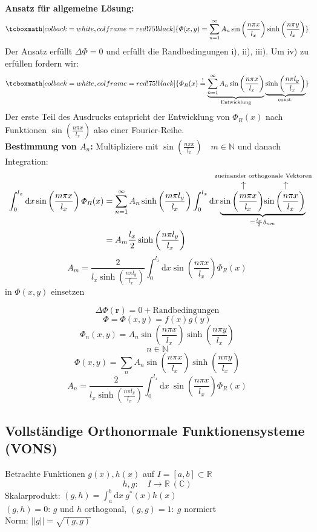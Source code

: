 \documentclass[titlepage,11pt,a4paper,ngerman]{report}
\newcommand{\tx}[1]{\textrm{#1}}
\newcommand{\const}{\tx{const.}}
\newcommand{\ub}[1]{\underbrace{#1}}
\newcommand{\dd}{\tx{d}}
\newcommand{\custoup}[3]{\overset{\scriptstyle\underset{\mkern4mu\rotatebox{-90}{$\hspace{-3pt} #1$}}{#3}}{#2}}
\renewcommand{\Phi}{\varPhi}
\newcommand{\intt}[2]{\int_{#1}^{#2}}
\renewcommand{\vec}[1]{\boldsymbol{#1}}
\newcommand{\rmbox}[1]{\tcboxmath[colback=white,colframe=red!75!black]{#1}}
\newcommand{\bbb}[2]{\begin{tcolorbox}[colback=white,colframe=black,fonttitle=\bfseries,title=#1,sharp corners,tcbox raise base]#2\end{tcolorbox}}
\begin{document}
\textbf{Ansatz für allgemeine Lösung:}
\begin{equation*}
\rmbox{\Phi(x,y) = \sum_{n=1}^{\infty} A_n \sin \left(\frac{n \pi x}{l_x}\right) \sinh \left(\frac{n \pi y}{l_x}\right)}
\end{equation*}
Der Ansatz erfüllt $ \Delta \Phi = 0 $ und erfüllt die Randbedingungen i), ii), iii). Um iv) zu erfüllen fordern wir:
\begin{equation*}
\rmbox{\Phi_R(x) \buildrel ! \over = \ub{\sum_{n=1}^{\infty} A_n \sin\left(\frac{n \pi x}{l_x}\right)}_{\tx{Entwicklung}} \ub{\sinh\left(\frac{n \pi l_y}{l_x}\right)}_{\const}}
\end{equation*}
Der erste Teil des Ausdrucks entspricht der Entwicklung von $ \Phi_R(x) $ nach Funktionen $ \sin \left(\frac{n \pi x}{l_x}\right) $ also einer Fourier-Reihe.\\[5pt]
\textbf{Bestimmung von $ A_n $:}
Multipliziere mit $ \sin\left(\frac{n \pi x}{l_x}\right) \quad m \in \mathbb{N} $ und danach Integration:
\begin{align*}
\int_{0}^{l_x} \dd x \sin\left(\frac{m \pi x}{l_x}\right) \Phi_R (x) &= \sum_{n=1}^{\infty} A_n \sinh\left(\frac{m \pi l_y}{l_x}\right) \int_{0}^{l_x} \dd x \ub{\custoup{\leftarrow}{\sin\left(\frac{m \pi x}{l_x}\right)}{\qquad \qquad \quad \mathclap{\tx{zueinander orthogonale Vektoren}}} \custoup{\leftarrow}{\sin\left(\frac{n \pi x}{l_x}\right)}{}}_{= \frac{l_x}{2} \delta_{nm}}\\
&= A_m \frac{l_x}{2} \sinh\left(\frac{n \pi l_y}{l_x}\right)
\end{align*}
\begin{equation*}
A_m = \frac{2}{l_x \sinh\left(\frac{n \pi l_y}{l_x}\right)} \int_{0}^{l_x} \dd x \sin \left(\frac{n \pi x}{l_x}\right) \Phi_R(x)
\end{equation*}
in $ \Phi(x,y) $ einsetzen\\[5pt]


\bbb{Wiederholung}{$$\Delta \Phi(\vec{r}) = 0 + \textrm{Randbedingungen}$$
$$\Phi = \Phi(x,y) = f(x)g(y)$$
$$\Phi_n(x,y) = A_n \sin\left(\frac{n \pi x}{l_x}\right) \sinh\left(\frac{n \pi y}{l_x}\right)$$
$$n \in \mathbb N$$
$$\Phi(x,y) = \sum_n A_n \sin\left(\frac{n \pi x}{l_x}\right) \sinh\left(\frac{n \pi y}{l_x}\right)$$
$$A_n = \frac{2}{l_x \sinh\left(\frac{n \pi l_y}{l_x}\right)} \intt{0}{l_x}\textrm{d}x\ \sin\left(\frac{n \pi x}{l_x}\right) \Phi_R (x)$$} %

\subsection{Vollständige Orthonormale Funktionensysteme (VONS)}
Betrachte Funktionen $g(x),h(x)$ auf $I = [a,b] \subset \mathbb R$
$$h,g: \quad I \to \mathbb R\ (\mathbb C)$$
Skalarprodukt: $(g,h) = \int_a^b \textrm{d}x\ g^* (x) h(x)$\\
$(g,h) = 0$: $g$ und $h$ orthogonal, $(g,g) = 1:\ g$ normiert\\
Norm: $||g|| = \sqrt{(g,g)}$
\end{document}
